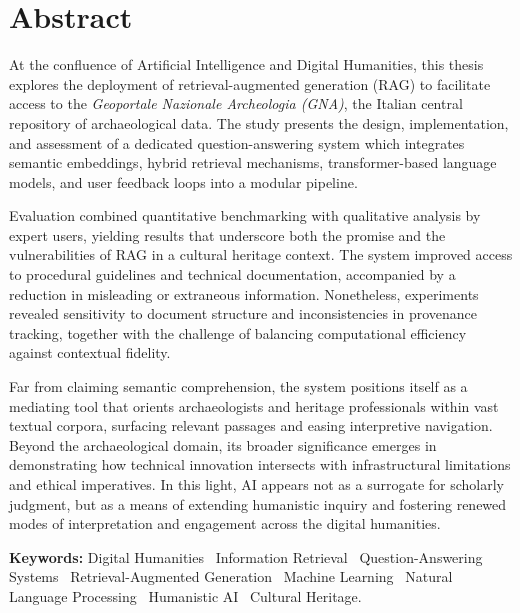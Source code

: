 \chapter{Abstract}
\label{chap:abstract}
\begin{spacing}{1.5}
At the confluence of Artificial Intelligence and Digital Humanities, this thesis explores the deployment of retrieval-augmented generation (RAG) to facilitate access to the \textit{Geoportale Nazionale Archeologia (GNA)}, the Italian central repository of archaeological data. The study presents the design, implementation, and assessment of a dedicated question-answering system which integrates semantic embeddings, hybrid retrieval mechanisms, transformer-based language models, and user feedback loops into a modular pipeline.

Evaluation combined quantitative benchmarking with qualitative analysis by expert users, yielding results that underscore both the promise and the vulnerabilities of RAG in a cultural heritage context. The system improved access to procedural guidelines and technical documentation, accompanied by a reduction in misleading or extraneous information. Nonetheless, experiments revealed sensitivity to document structure and inconsistencies in provenance tracking, together with the challenge of balancing computational efficiency against contextual fidelity.

Far from claiming semantic comprehension, the system positions itself as a mediating tool that orients archaeologists and heritage professionals within vast textual corpora, surfacing relevant passages and easing interpretive navigation. Beyond the archaeological domain, its broader significance emerges in demonstrating how technical innovation intersects with infrastructural limitations and ethical imperatives. In this light, AI appears not as a surrogate for scholarly judgment, but as a means of extending humanistic inquiry and fostering renewed modes of interpretation and engagement across the digital humanities.

\vspace{\baselineskip} %
\noindent\textbf{Keywords:} Digital Humanities \textperiodcentered\ Information Retrieval \textperiodcentered\ Question-Answering Systems \textperiodcentered\ Retrieval-Augmented Generation \textperiodcentered\ Machine Learning \textperiodcentered\ Natural Language Processing \textperiodcentered\ Humanistic AI \textperiodcentered\ Cultural Heritage.

\end{spacing}